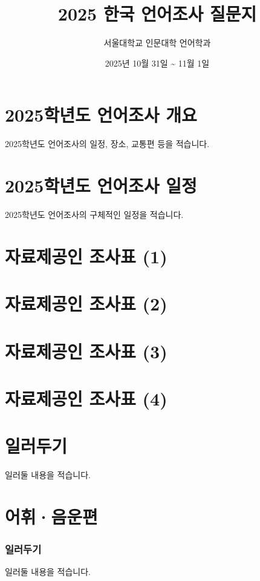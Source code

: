 \documentclass{snu-fl-questionnaire}
\title{2025 한국 언어조사 질문지}
\author{서울대학교 인문대학 언어학과}
\date{2025년 10월 31일 \textasciitilde{} 11월 1일}
\begin{document}
\frontmatter
\maketitle
\tableofcontents

\chapter{2025학년도 언어조사 개요}
2025학년도 언어조사의 일정, 장소, 교통편 등을 적습니다.

\chapter{2025학년도 언어조사 일정}
2025학년도 언어조사의 구체적인 일정을 적습니다.

\chapter{자료제공인 조사표 (1)}
\Consultant

\chapter{자료제공인 조사표 (2)}
\Consultant

\chapter{자료제공인 조사표 (3)}
\Consultant

\chapter{자료제공인 조사표 (4)}
\Consultant

\chapter{일러두기}
일러둘 내용을 적습니다.


\mainmatter
\chapter{어휘·음운편}
\subsection{일러두기}
일러둘 내용을 적습니다.




\end{document}

